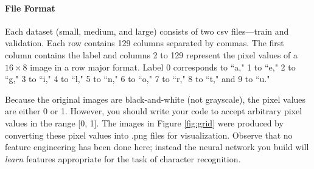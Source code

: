 \documentclass[11pt,addpoints,answers]{exam}
\begin{document}

\paragraph{File Format} Each dataset (small, medium, and large) consists of two csv files---train and validation. Each row contains 129 columns separated by commas. The first column contains the label and columns 2 to 129 represent the pixel values of a $16 \times 8$ image in a row major format. Label 0 corresponds to ``a," 1 to ``e," 2 to ``g," 3 to ``i," 4 to ``l," 5 to ``n," 6 to ``o," 7 to ``r," 8 to ``t," and 9 to ``u."

%
Because the original images are black-and-white (not grayscale), the pixel values are either 0 or 1. However, you should write your code to accept arbitrary pixel values in the range [0, 1]. The images in Figure \ref{fig:grid} were produced by converting these pixel values into .png files for visualization. Observe that no feature engineering has been done here; instead the neural network you build will \emph{learn} features appropriate for the task of character recognition.

\end{document}

